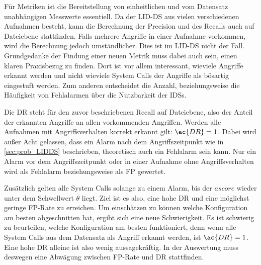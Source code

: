     Für Metriken ist die Bereitstellung von einheitlichen und vom Datensatz unabhängigen Messwerte essentiell.
    Da der \ac{LID-DS} aus vielen verschiedenen Aufnahmen besteht, kann die Berechnung der Precision und des Recalls auch auf Dateiebene stattfinden.
    Falls mehrere Angriffe in einer Aufnahme vorkommen, wird die Berechnung jedoch umständlicher.
    Dies ist im \ac{LID-DS} nicht der Fall.  
    Grundgedanke der Findung einer neuen Metrik muss dabei auch sein, einen klaren Praxisbezug zu finden. 
    Dort ist vor allem interessant, wieviele Angriffe erkannt werden und nicht wieviele System Calls der Angriffe als bösartig eingestuft werden.
    Zum anderen entscheidet die Anzahl, beziehungsweise die Häufigkeit von Fehlalarmen über die Nutzbarkeit der \acp{IDS}.\par\medskip
    Die \ac{DR} steht für den zuvor beschriebenen Recall auf Dateiebene, also der Anteil der erkannten Angriffe an allen vorkommenden Angriffen.
    Werden alle Aufnahmen mit Angriffsverhalten korrekt erkannt gilt: $\ac{DR}=1$.
    Dabei wird außer Acht gelassen, dass ein Alarm nach dem Angriffszeitpunkt wie in \autoref{sec:prob_LIDDS} beschrieben, theoretisch auch ein Fehlalarm sein kann.
    Nur ein Alarm vor dem Angriffszeitpunkt oder in einer Aufnahme ohne Angriffsverhalten wird als Fehlalarm beziehungsweise als \ac{FP} gewertet.\par\medskip
    Zusätzlich gelten alle System Calls solange zu einem Alarm, bis der $ascore$ wieder unter dem Schwellwert $\theta$ liegt.
    Ziel ist es also, eine hohe \ac{DR} und eine möglichst geringe \ac{FP}-Rate zu erreichen.
    Um einschätzen zu können welche Konfiguration am besten abgeschnitten hat, ergibt sich eine neue Schwierigkeit.
    Es ist schwierig zu beurteilen, welche Konfiguration am besten funktioniert, denn wenn alle System Calls aus dem Datensatz als Angriff erkannt werden, ist $\ac{DR}=1$.
    Eine hohe \ac{DR} alleine ist also wenig aussagekräftig.
    In der Auswertung muss deswegen eine Abwägung zwischen \ac{FP}-Rate und \ac{DR} stattfinden.
